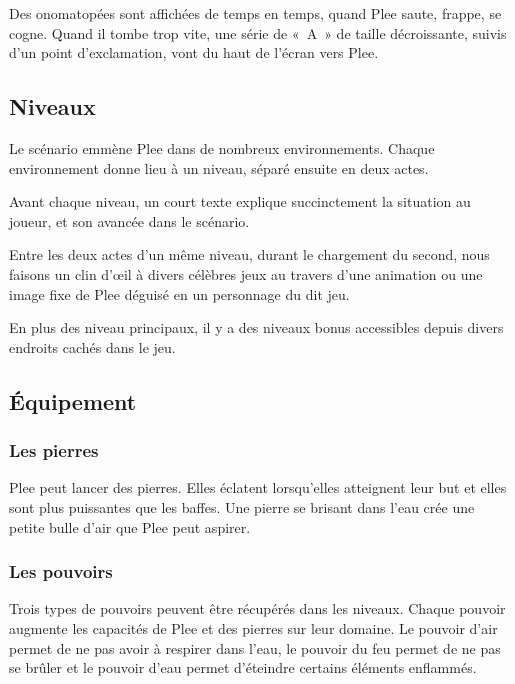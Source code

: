 \documentclass{article}
\begin{document}
Des onomatopées sont affichées de temps en temps, quand Plee saute,
frappe, se cogne. Quand il tombe trop vite, une série de «~A~» de taille
décroissante, suivis d'un point d'exclamation, vont du haut de l'écran
vers Plee.

\subsection{Niveaux}
Le scénario emmène Plee dans de nombreux environnements. Chaque
environnement donne lieu à un niveau, séparé ensuite en deux actes.

Avant chaque niveau, un court texte explique succinctement la situation
au joueur, et son avancée dans le scénario.

Entre les deux actes d'un même niveau, durant le chargement du second,
nous faisons un clin d'\oe il à divers célèbres jeux au travers d'une
animation ou une image fixe de Plee déguisé en un personnage du dit
jeu.

En plus des niveau principaux, il y a des niveaux bonus accessibles
depuis divers endroits cachés dans le jeu.

\subsection{Équipement}

\subsubsection{Les pierres}
\label{sec:pierres}
Plee peut lancer des pierres. Elles éclatent lorsqu'elles atteignent
leur but et elles sont plus puissantes que les baffes. Une pierre se
brisant dans l'eau crée une petite bulle d'air que Plee peut aspirer.

\subsubsection{Les pouvoirs}
Trois types de pouvoirs peuvent être récupérés dans les
niveaux. Chaque pouvoir augmente les capacités de Plee et des pierres
sur leur domaine. Le pouvoir d'air permet de ne pas avoir à respirer
dans l'eau, le pouvoir du feu permet de ne pas se brûler et le pouvoir
d'eau permet d'éteindre certains éléments enflammés.
\end{document}
